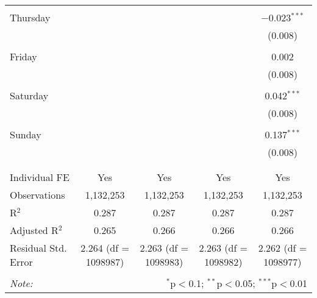 \documentclass[
]{article}
\begin{document}
\begin{table}[!htbp]
{\begin{tabular}{@{\extracolsep{5pt}}lcccc}
  & & & & \\ 
 Thursday &  &  &  & $-$0.023$^{***}$ \\ 
  &  &  &  & (0.008) \\ 
  & & & & \\ 
 Friday &  &  &  & 0.002 \\ 
  &  &  &  & (0.008) \\ 
  & & & & \\ 
 Saturday &  &  &  & 0.042$^{***}$ \\ 
  &  &  &  & (0.008) \\ 
  & & & & \\ 
 Sunday &  &  &  & 0.137$^{***}$ \\ 
  &  &  &  & (0.008) \\ 
  & & & & \\ 
\hline \\[-1.8ex] 
Individual FE & Yes & Yes & Yes & Yes \\ 
Observations & 1,132,253 & 1,132,253 & 1,132,253 & 1,132,253 \\ 
R$^{2}$ & 0.287 & 0.287 & 0.287 & 0.287 \\ 
Adjusted R$^{2}$ & 0.265 & 0.266 & 0.266 & 0.266 \\ 
Residual Std. Error & 2.264 (df = 1098987) & 2.263 (df = 1098983) & 2.263 (df = 1098982) & 2.262 (df = 1098977) \\ 
\hline 
\hline \\[-1.8ex] 
\textit{Note:}  & \multicolumn{4}{r}{$^{*}$p$<$0.1; $^{**}$p$<$0.05; $^{***}$p$<$0.01} \\ 
\end{tabular}
} 
\end{table} 
\newpage
\end{document}
